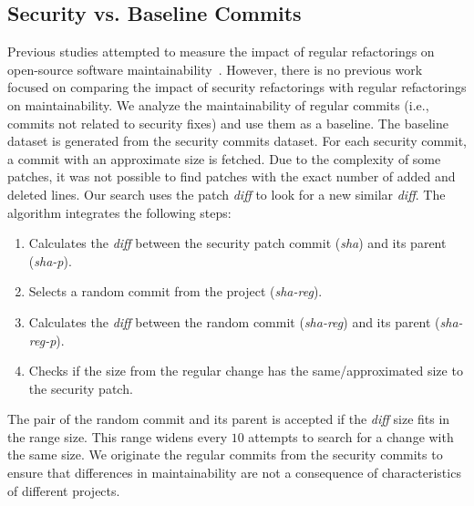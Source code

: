 \documentclass[smallextended]{svjour3}       %
\begin{document}
%
\subsection{Security vs. Baseline Commits}
%
Previous studies attempted to measure the impact of regular refactorings on
open-source software maintainability~\cite{HEGEDUS2018313}. However, there is no
previous work focused on comparing the impact of security refactorings with
regular refactorings on maintainability.
We analyze the maintainability of regular commits (i.e., commits not related
to security fixes) and use them as a baseline.
The baseline dataset is generated from the security commits dataset.
For each
security commit, a commit with an approximate size is fetched. Due to the complexity 
of some patches, it was not possible to find patches with the exact number of added and 
deleted lines. Our search uses the patch \emph{diff} to look for a new similar \emph{diff}. 
The algorithm integrates the following steps:

\begin{enumerate}
\item Calculates the \emph{diff} between the security patch commit (\emph{sha}) and its parent (\emph{sha-p}).
\item Selects a random commit from the project (\emph{sha-reg}).
\item Calculates the \emph{diff} between the random commit (\emph{sha-reg}) and its parent (\emph{sha-reg-p}).
\item Checks if the size from the regular change has the same/approximated size to 
the security patch.
\end{enumerate}

The pair of the random commit and its parent is accepted if the \emph{diff} 
size fits in the range size. This range widens every $10$ attempts to
search for a change with the same size. We originate the regular commits from the 
security commits to ensure that differences in maintainability are not a 
consequence of characteristics of different projects.
\end{document}
